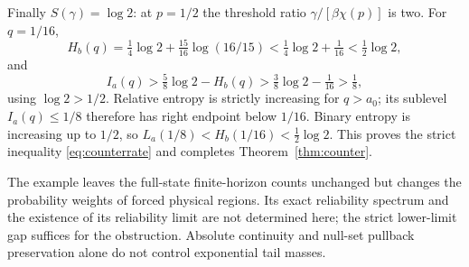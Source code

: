 \documentclass[11pt]{amsart}
\theoremstyle{definition}
\theoremstyle{remark}
\numberwithin{equation}{section}
\begin{document}
Finally $S(\gamma)=\log2$: at $p=1/2$ the threshold ratio
$\gamma/[\beta\chi(p)]$ is two. For $q=1/16$,
\[
H_b(q)=\tfrac14\log2+\tfrac{15}{16}\log(16/15)
 <\tfrac14\log2+\tfrac1{16}<\tfrac12\log2,
\]
and
\[
I_a(q)>\tfrac58\log2-H_b(q)
 >\tfrac38\log2-\tfrac1{16}>\tfrac18,
\]
using $\log2>1/2$. Relative entropy is strictly increasing for
$q>a_0$; its sublevel $I_a(q)\le1/8$ therefore has right endpoint
below $1/16$. Binary entropy is increasing up to $1/2$, so
$L_a(1/8)<H_b(1/16)<\tfrac12\log2$.
This proves the strict inequality \eqref{eq:counterrate} and completes
Theorem~\ref{thm:counter}.

The example leaves the full-state finite-horizon counts unchanged
but changes the probability weights of forced physical regions.
Its exact reliability spectrum and the existence of its
reliability limit are not determined here; the strict lower-limit
gap suffices for the obstruction. Absolute continuity and null-set
pullback preservation alone do not control exponential tail masses.
\end{document}
